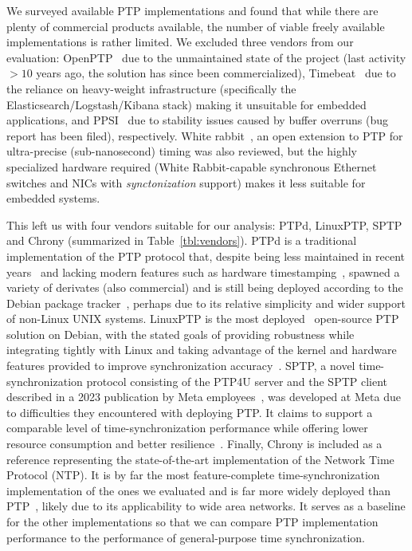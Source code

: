 We surveyed available PTP implementations and found that while there are plenty of commercial products available, the number of viable freely available implementations is rather limited. We excluded three vendors from our evaluation: OpenPTP~\cite{openptp} due to the unmaintained state of the project (last activity $>10$ years ago, the solution has since been commercialized), Timebeat~\cite{timebeat} due to the reliance on heavy-weight infrastructure (specifically the Elasticsearch/Logstash/Kibana stack) making it unsuitable for embedded applications, and PPSI~\cite{ppsi} due to stability issues caused by buffer overruns (bug report\cite{ppsi-bug-report} has been filed), respectively. White rabbit~\cite{white-rabbit}, an open extension to PTP for ultra-precise (sub-nanosecond) timing was also reviewed, but the highly specialized hardware required (White Rabbit-capable synchronous Ethernet switches and NICs with \emph{synctonization} support) makes it less suitable for embedded systems.

This left us with four vendors suitable for our analysis: PTPd, LinuxPTP, SPTP and Chrony (summarized in Table~\ref{tbl:vendors}).
PTPd is a traditional implementation of the PTP protocol that, despite being less maintained in recent years~\cite{ptpd-maintainers} and lacking modern features such as hardware timestamping~\cite{ptpd-manpage}, spawned a variety of derivates (also commercial) and is still being deployed according to the Debian package tracker~\cite{debian-popularity-contest}, perhaps due to its relative simplicity and wider support of non-Linux UNIX systems.
 LinuxPTP is the most deployed~\cite{debian-popularity-contest} open-source PTP solution on Debian, with the stated goals of providing robustness while integrating tightly with Linux and taking advantage of the kernel and hardware features provided to improve synchronization accuracy~\cite{linuxptp-homepage}.
SPTP, a novel time-synchronization protocol consisting of the PTP4U server and the SPTP client described in a 2023 publication by Meta employees~\cite{facebook-sptp}, was developed at Meta due to difficulties they encountered with deploying PTP. It claims to support a comparable level of time-synchronization performance while offering lower resource consumption and better resilience~\cite{facebook-sptp}.
Finally, Chrony is included as a reference representing the state-of-the-art implementation of the Network Time Protocol (NTP). It is by far the most feature-complete time-synchronization implementation of the ones we evaluated and is far more widely deployed than PTP~\cite{debian-popularity-contest}, likely due to its applicability to wide area networks. It serves as a baseline for the other implementations so that we can compare PTP implementation performance to the performance of general-purpose time synchronization.


